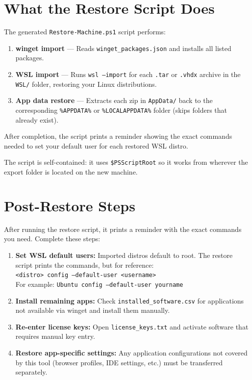 \documentclass[11pt,a4paper]{article}
\begin{document}
\section{What the Restore Script Does}

The generated \texttt{Restore-Machine.ps1} script performs:

\begin{enumerate}
    \item \textbf{winget import} --- Reads \texttt{winget\_packages.json} and installs all listed packages.
    \item \textbf{WSL import} --- Runs \texttt{wsl --import} for each \texttt{.tar} or \texttt{.vhdx} archive in the \texttt{WSL/} folder, restoring your Linux distributions.
    \item \textbf{App data restore} --- Extracts each zip in \texttt{AppData/} back to the corresponding \texttt{\%APPDATA\%} or \texttt{\%LOCALAPPDATA\%} folder (skips folders that already exist).
\end{enumerate}

After completion, the script prints a reminder showing the exact commands needed to set your default user for each restored WSL distro.

The script is self-contained: it uses \texttt{\$PSScriptRoot} so it works from wherever the export folder is located on the new machine.

\section{Post-Restore Steps}
\label{sec:postrestore}

After running the restore script, it prints a reminder with the exact commands you need. Complete these steps:

\begin{enumerate}
    \item \textbf{Set WSL default users:} Imported distros default to root. The restore script prints the commands, but for reference:\\
    \texttt{<distro> config --default-user <username>}\\
    For example: \texttt{Ubuntu config --default-user yourname}
    \item \textbf{Install remaining apps:} Check \texttt{installed\_software.csv} for applications not available via winget and install them manually.
    \item \textbf{Re-enter license keys:} Open \texttt{license\_keys.txt} and activate software that requires manual key entry.
    \item \textbf{Restore app-specific settings:} Any application configurations not covered by this tool (browser profiles, IDE settings, etc.) must be transferred separately.
\end{enumerate}
\end{document}
